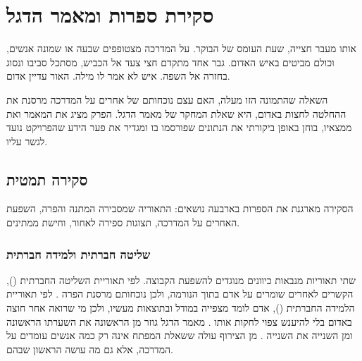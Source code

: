 \chapter{סקירת ספרות ומאמר הדגל}
\begin{scenebox}
אותו מעבר חצייה, שעת העומס של הבוקר. על המדרכה מצטופפים שבעה או שמונה אנשים, וכולם מביטים באיש האדום.
גבר אחד מתקדם חצי צעד אל הכביש, מסתכל סביבו ונסוג בחזרה אל השפה.
איש לא אמר לו מילה. האור עדיין אדום.
\end{scenebox}

השאלה שהתמונה הזו מעלה, האם עצם נוכחותם של אחרים על המדרכה מרסנת את ההחלטה לחצות באדום, היא שאלת המחקר של מאמר הדגל.
הפרק מציג את המאמר ואת ממצאיו, בוחן באופן ביקורתי את הנתונים שפורסמו בו ומגדיר את פער הידע שהפרויקט נועד לגשר עליו.

\section{סקירה תמטית}
הסקירה מארגנת את הספרות בארבעה נושאים: התאוריה שמסבירה המתנה והפרה, השפעת האחרים על המדרכה, תצוגות ספירה לאחור, וחישת ממתינים.

\subsection{שליטה חברתית ולמידה חברתית}
שתי תאוריות מנבאות כיוונים מנוגדים להשפעת הקבוצה.
לפי תאוריית השליטה החברתית (), הקשרים לאחרים שומרים על אדם בתוך הנורמה, ולכן נוכחותם מרסנת הפרה \cite{hirschi1969}.
לפי תאוריית הלמידה החברתית (), אדם לומד מצפייה במודל ובתוצאות מעשיו, ולכן מי שרואה אחר חוצה באדום בלי להיענש צפוי לחקות אותו \cite{bandura1977}.
מאמר הדגל גוזר מן הראשונה את השערתו הראשונה ומן השנייה את השנייה \cite{rosenbloom2009}.
מן הצירוף עולה ששאלת המפתח אינה רק כמה אנשים עומדים על המדרכה, אלא גם מה עושה הראשון שבהם.

